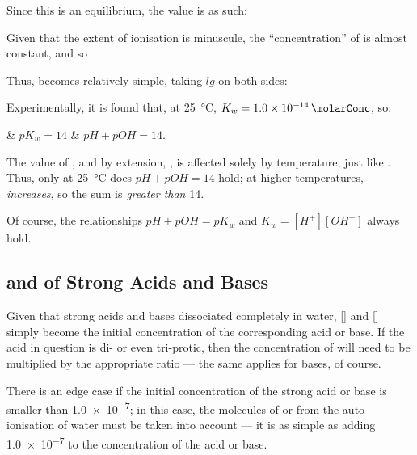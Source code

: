 			Since this is an equilibrium, the \Kc{} value is as such:


			Given that the extent of ionisation is minuscule, the ``concentration'' of  is almost constant, and so


			Thus, \pKw{} becomes relatively simple, taking $lg$ on both sides:


			Experimentally, it is found that, at \SI{25}{\celsius}, $K_{w} = \SI{1.0e-14}{\molarConc}$, so:
			\begin{bulletlist}
				& $pK_{w} = 14$
				& $pH + pOH = 14$.
			\end{bulletlist}

			The value of \Kw{}, and by extension, \pKw{}, is affected solely by temperature, just like \Kc{}. Thus, only at \SI{25}{\celsius}
			does $pH + pOH = 14$ hold; at higher temperatures, \Kw{} \textit{increases}, so the sum is \textit{greater than} \num{14}.

			Of course, the relationships $pH + pOH = pK_{w}$ and $K_{w} = [H^{+}][OH^{-}]$ always hold.



		\pagebreak
		\subsection{\MpH{} and \MpOH{} of Strong Acids and Bases}

			Given that strong acids and bases dissociated completely in water, [] and [] simply become the initial concentration
			of the corresponding acid or base. If the acid in question is di- or even tri-protic, then the concentration of  will need
			to be multiplied by the appropriate ratio --- the same applies for bases, of course.

			There is an edge case if the initial concentration of the strong acid or base is smaller than \SI{1.0e-7}{\molarConc}; in this case,
			the molecules of  or  from the auto-ionisation of water must be taken into account --- it is as simple as adding
			\num{1.0e-7} to the concentration of the acid or base.


